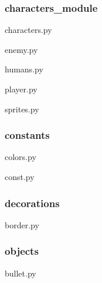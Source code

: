 \documentclass[a4paper, 11pt]{report}
\begin{document}
\subsubsection{characters\_module}
characters.py

enemy.py


humans.py


player.py


sprites.py


\subsubsection{constants}

colors.py


const.py


\subsubsection{decorations}
border.py


\subsubsection{objects}
bullet.py

\end{document}
